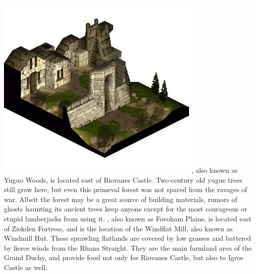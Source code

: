 %
\vfill
{}
%
\clearpage
\includegraphics[width=\columnwidth]{./art/worldbook/yardrow.jpg}
\vfill
%
, also known as Yuguo Woods, is located east of Riovanes Castle.
Two-century old yugue trees still grow here, but even this primeval forest was not spared from the ravages of war. 
Albeit the forest may be a great source of building materials, rumors of ghosts haunting its ancient trees keep anyone except for the most courageous or stupid lumberjacks from using it.
, also known as Fovoham Plains, is located east of Ziekden Fortress, and is the location of the Windflat Mill, also known as Windmill Hut. 
These sprawling flatlands are covered by low grasses and battered by fierce winds from the Rhana Straight. 
They are the main farmland area of the Grand Duchy, and provide food not only for Riovanes Castle, but also to Igros Castle as well.
%
\vfill
